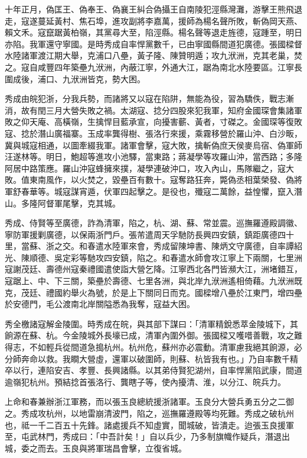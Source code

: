 \begin{pinyinscope}
十年正月，偽匡王、偽奉王、偽襄王糾合偽攝王自南陵犯涇縣灣灘，游擊王熊飛退走，寇遂蔓延黃村、焦石埠，進攻副將李嘉萬，援師為楊名聲所敗，斬偽岡天燕、賴文禾。寇竄踞黃柏嶺，其黨尋大至，陷涇縣。楊名聲等退走旌德，寇踵至，明日亦陷。我軍還守寧國。是時秀成自率悍黨數千，已由寧國縣間道犯廣德。張國樑督水陸諸軍渡江期大舉，克浦口八壘，黃子隆、陳贊明遁；攻九洑洲，克其老巢，焚之。寇自咸豐四年築壘九洑洲，內蔽江寧，外通大江，踞為南北水陸要區。江寧長圍成後，浦口、九洑洲皆克，勢大困。

秀成由皖犯浙，分我兵勢，而諸將又以寇在陷阱，無能為役，習為驕佚，戰志漸消，故有閏三月大營失敗之禍。太湖寇、捻分四股來犯我軍，知府金國琛會集諸軍敗之仰天庵、高橫嶺，生擒悍目藍承宣，向擾害蘄、黃者，寸磔之。金國琛等復敗寇、捻於潛山廣福寨。玉成率龔得樹、張洛行來援，乘霧移營於羅山沖、白沙畈，冀與城寇相通，以圖牽綴我軍。諸軍會擊，寇大敗，擒斬偽庶天侯麥烏宿、偽軍師汪遂林等。明日，鮑超等進攻小池驛，當東路；蔣凝學等攻羅山沖，當西路；多隆阿居中路策應。羅山沖寇蜂擁來撲，凝學連破沖口，攻入內山，馬隊繼之，寇大敗。值東南風作，以火焚之，毀壘百有數十。寇奪路狂奔，斃偽丞相葉榮發、偽將軍舒春華等。城寇謀宵遁，伏軍四起擊之。是役也，殲寇二萬餘，益惶懼，竄入潛山。多隆阿督軍尾擊，克其城。

秀成、侍賢等至廣德，詐為清軍，陷之，杭、湖、蘇、常並震。巡撫羅遵殿調徽、寧防軍援剿廣德，以保兩浙門戶。張芾遣周天孚馳防長興四安鎮，鎮距廣德四十里，當蘇、浙之交。和春遣水陸軍來會，秀成留陳坤書、陳炳文守廣德，自率譚紹光、陳順德、吳定彩等馳攻四安鎮，陷之。和春遣水師會攻江寧上下兩關，七里洲寇謝茂廷、壽德州寇秦禮國遣使詣大營乞降。江寧西北各門皆瀕大江，洲堵錯互，寇踞上、中、下三關，築壘於壽德、七里各洲，與北岸九洑洲遙相倚藉。九洑洲既克，茂廷、禮國約舉火為號，於是上下關同日而克。國樑增八壘於江東門，增四壘於安德門，毛公渡南北岸關隘悉為我奪，寇益大困。

秀全檄諸寇解金陵圍。時秀成在皖，與其部下謀曰：「清軍精銳悉萃金陵城下，其餉源在蘇、杭。今金陵城外長壕已成，清軍內圍外御。張國樑又嚄唶善戰，攻之難得志，不如輕兵從間道急搗杭州。杭州危，蘇州亦必震動。清軍慮我絕其餉源，必分師奔命以救。我瞷大營虛，還軍以破圍師，則蘇、杭皆我有也。」乃自率數千精卒以行，連陷安吉、孝豐、長興諸縣。以其弟侍賢犯湖州，自率悍黨陷武康，間道逾嶺犯杭州。預結捻首張洛行、龔瞎子等，使內擾清、淮，以分江、皖兵力。

上命和春兼辦浙江軍務，而以張玉良總統援浙諸軍。玉良分大營兵勇五分之二御之。秀成攻杭州，以地雷崩清波門，陷之，巡撫羅遵殿等均死難。秀成之破杭州也，祗一千二百五十先鋒。諸處援兵不知虛實，聞城破，皆潰走。迨張玉良援軍至，屯武林門，秀成曰：「中吾計矣！」自以兵少，乃多制旗幟作疑兵，潛退出城，委之而去。玉良與將軍瑞昌會擊，立復省城。


\end{pinyinscope}
